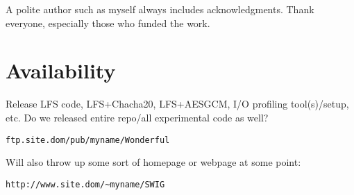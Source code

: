 \documentclass[letterpaper,twocolumn,10pt]{article}
\begin{document}
A polite author such as myself always includes acknowledgments. Thank everyone, especially those who funded the work.

\section{Availability}

Release LFS code, LFS+Chacha20, LFS+AESGCM, I/O profiling tool(s)/setup, etc. Do we released entire repo/all experimental
code as well?

\begin{center}
{\tt ftp.site.dom/pub/myname/Wonderful}\\
\end{center}

Will also throw up some sort of homepage or webpage at some point:

\begin{center}
{\tt http://www.site.dom/\~{}myname/SWIG}
\end{center}

{\footnotesize  }

\end{document}

